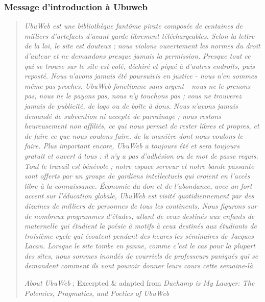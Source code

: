 \subsubsection*{Message d'introduction à Ubuweb}

\begin{quote}
  \textit{  UbuWeb est une bibliothèque fantôme pirate composée de centaines de milliers d'artefacts d'avant-garde librement téléchargeables. Selon la lettre de la loi, le site est douteux ; nous violons ouvertement les normes du droit d'auteur et ne demandons presque jamais la permission. Presque tout ce qui se trouve sur le site est volé, déchiré et piqué à d'autres endroits, puis reposté. Nous n'avons jamais été poursuivis en justice - nous n'en sommes même pas proches. UbuWeb fonctionne sans argent - nous ne le prenons pas, nous ne le payons pas, nous n'y touchons pas ; vous ne trouverez jamais de publicité, de logo ou de boîte à dons. Nous n'avons jamais demandé de subvention ni accepté de parrainage ; nous restons heureusement non affiliés, ce qui nous permet de rester libres et propres, et de faire ce que nous voulons faire, de la manière dont nous voulons le faire. Plus important encore, UbuWeb a toujours été et sera toujours gratuit et ouvert à tous : il n'y a pas d'adhésion ou de mot de passe requis. Tout le travail est bénévole ; notre espace serveur et notre bande passante sont offerts par un groupe de gardiens intellectuels qui croient en l'accès libre à la connaissance. Économie du don et de l'abondance, avec un fort accent sur l'éducation globale, UbuWeb est visité quotidiennement par des dizaines de milliers de personnes de tous les continents. Nous figurons sur de nombreux programmes d'études, allant de ceux destinés aux enfants de maternelle qui étudient la poésie à motifs à ceux destinés aux étudiants de troisième cycle qui écoutent pendant des heures les séminaires de Jacques Lacan. Lorsque le site tombe en panne, comme c'est le cas pour la plupart des sites, nous sommes inondés de courriels de professeurs paniqués qui se demandent comment ils vont pouvoir donner leurs cours cette semaine-là.}

  \textit{About UbuWeb }; Excerpted \& adapted from \textit{Duchamp is My Lawyer: The Polemics, Pragmatics, and Poetics of UbuWeb}

  \end{quote}

